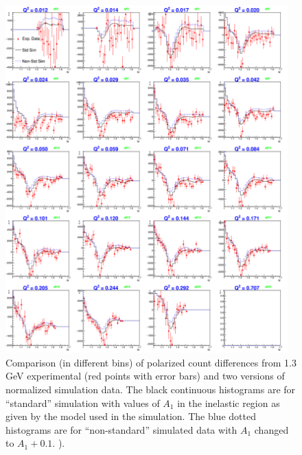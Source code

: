 \begin{figure}[H] %
  \leavevmode \includegraphics[width=0.97\textwidth]{figuresEG4/FigAnal/xsDiff_StdD79_nStdD80C71S181Eb7Wbins70NZmd.png}
  \caption[$\Delta n$ for data and simulation]{Comparison (in different \qsqs bins) of polarized count differences from 1.3 GeV experimental (red points with error bars) and two versions of normalized simulation data. The black continuous histograms are for ``standard'' simulation with values of $A_1$ in the inelastic region as given by the model used in the simulation. The blue dotted histograms are for ``non-standard'' simulated data with $A_1$ changed to $A_1 + 0.1$. ). %
  }
  \label{xsComp7}  %
\end{figure}



